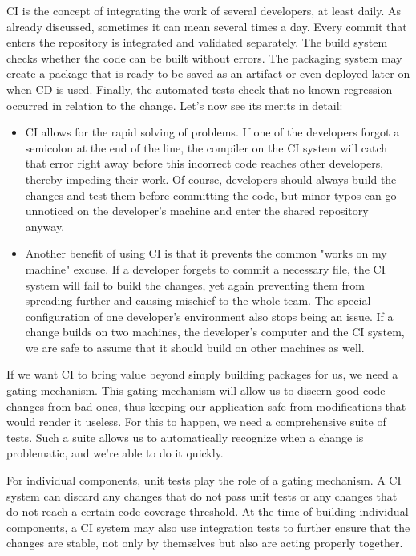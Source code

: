 
CI is the concept of integrating the work of several developers, at least daily. As already discussed, sometimes it can mean several times a day. Every commit that enters the repository is integrated and validated separately. The build system checks whether the code can be built without errors. The packaging system may create a package that is ready to be saved as an artifact or even deployed later on when CD is used. Finally, the automated tests check that no known regression occurred in relation to the change. Let's now see its merits in detail:

\begin{itemize}
\item 
CI allows for the rapid solving of problems. If one of the developers forgot a semicolon at the end of the line, the compiler on the CI system will catch that error right away before this incorrect code reaches other developers, thereby impeding their work. Of course, developers should always build the changes and test them before committing the code, but minor typos can go unnoticed on the developer's machine and enter the shared repository anyway.

\item 
Another benefit of using CI is that it prevents the common "works on my machine" excuse. If a developer forgets to commit a necessary file, the CI system will fail to build the changes, yet again preventing them from spreading further and causing mischief to the whole team. The special configuration of one developer's environment also stops being an issue. If a change builds on two machines, the developer's computer and the CI system, we are safe to assume that it should build on other machines as well.
\end{itemize}


If we want CI to bring value beyond simply building packages for us, we need a gating mechanism. This gating mechanism will allow us to discern good code changes from bad ones, thus keeping our application safe from modifications that would render it useless. For this to happen, we need a comprehensive suite of tests. Such a suite allows us to automatically recognize when a change is problematic, and we're able to do it quickly.

For individual components, unit tests play the role of a gating mechanism. A CI system can discard any changes that do not pass unit tests or any changes that do not reach a certain code coverage threshold. At the time of building individual components, a CI system may also use integration tests to further ensure that the changes are stable, not only by themselves but also are acting properly together.

